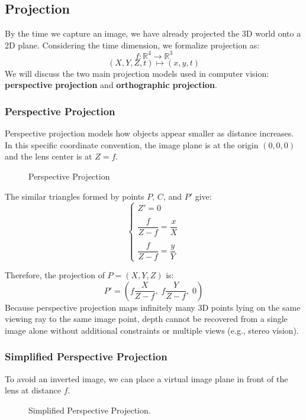 \subsection{Projection}
By the time we capture an image, we have already projected the 3D world onto a 2D plane. 
Considering the time dimension, we formalize projection as:
\[f: \mathbb{R}^4 \rightarrow \mathbb{R}^3\]
\[ (X, Y, Z, t) \mapsto (x, y, t)\]
We will discuss the two main projection models used in computer vision: \textbf{perspective projection} and \textbf{orthographic projection}.

\subsubsection{Perspective Projection}
Perspective projection models how objects appear smaller as distance increases. 
In this specific coordinate convention, the image plane is at the origin $(0,0,0)$ and the lens center is at $Z = f$.
\begin{figure}[H]
    \centering
    \scalebox{0.8}{
        
    }
    \caption{Perspective Projection}
\end{figure}

The similar triangles formed by points $P$, $C$, and $P'$ give:
\begin{equation*}
\begin{cases}
Z' = 0 \\\\
\dfrac{f}{Z - f} = \dfrac{x}{X} \\\\
\dfrac{f}{Z - f} = \dfrac{y}{Y}
\end{cases}
\end{equation*}

Therefore, the projection of $P=(X,Y,Z)$ is:
\[
P' = \left(f \frac{X}{Z - f},\; f \frac{Y}{Z - f},\; 0\right)
\]
Because perspective projection maps infinitely many 3D points lying on the same viewing ray to the same image point, 
depth cannot be recovered from a single image alone without additional constraints or multiple views (e.g., stereo vision).

\subsubsection*{Simplified Perspective Projection}
To avoid an inverted image, we can place a virtual image plane in front of the lens at distance $f$.
\begin{figure}[H]
    \centering
    \scalebox{0.8}{
        
    }
    \caption{Simplified Perspective Projection.}
\end{figure}

